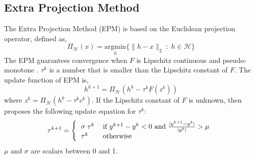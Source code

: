 \subsection{Extra Projection Method}
The Extra Projection Method (EPM) is based on the Euclidean projection operator, defined as,
\begin{equation}
\Pi_\mathcal{H}(x) = \underset{h}{\text{argmin}}\{\lVert h-x\rVert_2 \; : \;h \in\mathcal{H} \}
\end{equation}
The EPM guarantees convergence when $F$ is Lipschitz continuous and pseudo-monotone \cite{nie2010solving}. 
$\tau^k$ is a number that is smaller than the Lipschitz constant of $F$. The update function of EPM is,
\begin{equation}
h^{k+1} = \Pi_\mathcal{H}(h^k - \tau^k F(z^k))
\end{equation}
where $z^k = \Pi_\mathcal{H}(h^k - \tau^k c^k)$. If the Lipschitz constant of $F$ is unknown, then \cite{nie2010solving} proposes the following update equation for $\tau^k$:
\begin{equation}
\tau^{k+1} = \left\{
\begin{tabular}{ll}
$\sigma\;\tau^k$ & 
if $y^{k+1}-y^k < 0$ and $\frac{|y^{k+1}-y^k|}{|y^k|}> \mu$ \\
$\tau^k$ & otherwise
\end{tabular}
\right.
\end{equation}
$\mu$ and $\sigma$ are scalars between 0 and 1.
